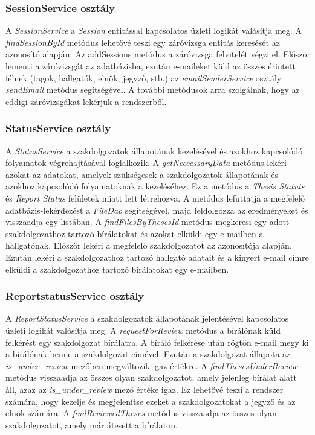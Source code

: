 \subsubsection{SessionService osztály}

A \textit{SessionService} a \textit{Session} entitással kapcsolatos üzleti logikát valósítja meg. A \textit{findSessionById} metódus lehetővé teszi egy záróvizsga entitás keresését az azonosító alapján. Az addSessions metódus a záróvizsga felvitelét végzi el. Először lementi a záróvizsgát az adatbázisba, ezután e-maileket küld az összes érintett félnek (tagok, hallgatók, elnök, jegyző, stb.) az \textit{emailSenderService} osztály \textit{sendEmail} metódus segítségével. A további metódusok arra szolgálnak, hogy az eddigi záróvizsgákat lekérjük a rendszerből.

\subsubsection{StatusService osztály}

A \textit{StatusService} a szakdolgozatok állapotának kezelésével és azokhoz kapcsolódó folyamatok végrehajtásával foglalkozik. A \textit{getNeccessaryData} metódus lekéri azokat az adatokat, amelyek szükségesek a szakdolgozatok állapotának és azokhoz kapcsolódó folyamatoknak a kezeléséhez. Ez a metódus a \textit{Thesis Statuts} és \textit{Report Status} felületek miatt lett létrehozva. A metódus lefuttatja a megfelelő adatbázis-lekérdezést a \textit{FileDao} segítségével, majd feldolgozza az eredményeket és visszaadja egy listában. A \textit{findFilesByThesesId} metódus megkeresi egy adott szakdolgozathoz tartozó bírálatokat és azokat elküldi egy e-mailben a hallgatónak. Először lekéri a megfelelő szakdolgozatot az azonosítója alapján. Ezután lekéri a szakdolgozathoz tartozó hallgató adatait és a kinyert e-mail címre elküldi a szakdolgozathoz tartozó bírálatokat egy e-mailben.


\subsubsection{ReportstatusService osztály}

A \textit{ReportStatusService} a szakdolgozatok állapotának jelentésével kapcsolatos üzleti logikát valósítja meg. A \textit{requestForReview} metódus a bírálónak küld felkérést egy szakdolgozat bírálatra. A bíráló felkérése után rögtön e-mail megy ki a bírálónak benne a szakdolgozat címével. Ezután a szakdolgozat állapota az \textit{is\_under\_review} mezőben megváltozik igaz értékre. A \textit{findThesesUnderReview} metódus visszaadja az összes olyan szakdolgozatot, amely jelenleg bírálat alatt áll, azaz az \textit{is\_under\_review} mező értéke igaz. Ez lehetővé teszi a rendszer számára, hogy kezelje és megjelenítse ezeket a szakdolgozatokat a jegyző és az elnök számára. A \textit{findReviewedTheses} metódus visszaadja az összes olyan szakdolgozatot, amely már átesett a bírálaton. 


